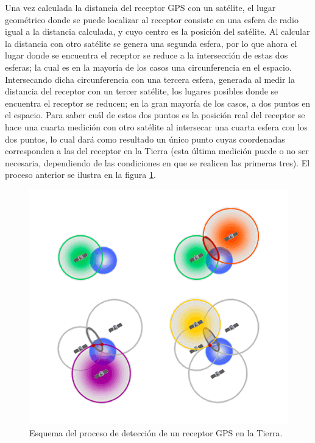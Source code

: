 Una vez calculada la distancia del receptor GPS con un satélite, el lugar geométrico donde se puede localizar al receptor consiste en una esfera de radio igual a la distancia calculada, y cuyo centro es la posición del satélite. 
Al calcular la distancia con otro satélite se genera una segunda esfera, por lo que ahora el lugar donde se encuentra el receptor se reduce a la intersección de estas dos esferas; la cual es en la mayoría de los casos una circunferencia en el espacio. 
Intersecando dicha circunferencia con una tercera esfera, generada al medir la distancia del receptor con un tercer satélite, los lugares posibles donde se encuentra el receptor se reducen; en la gran mayoría de los casos, a dos puntos en el espacio. 
Para saber cuál de estos dos puntos es la posición real del receptor se hace una cuarta medición con otro satélite al intersecar una cuarta esfera con los dos puntos, lo cual dará como resultado un único punto cuyas coordenadas corresponden a las del receptor en la Tierra (esta última medición puede o no ser necesaria, dependiendo de las condiciones en que se realicen las primeras tres). 
El proceso anterior se ilustra en la figura \ref{figura2}.%

\begin{figure}[H]
\centering
\includegraphics[scale=0.72]{GPS2.png}
\caption[Caption for LOF]{Esquema del proceso de detección de un receptor GPS en la Tierra\footnotemark[1].}
\label{figura2}
\end{figure}

